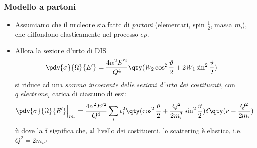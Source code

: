 \subsubsection{Modello a partoni}
\begin{itemize}
    \item Assumiamo che il nucleone sia fatto di \textit{partoni} (elementari, spin $\frac{1}{2}$, massa $m_i$), che diffondono elasticamente nel processo $ep$.
    \item Allora la sezione d'urto di DIS
    \begin{equation*}
    \pdv{\sigma}{\Omega}{E'}=\frac{4\alpha^2E'^2}{Q^4}\qty(W_2\cos^2\frac{\vartheta}{2}+2W_1\sin^2\frac{\vartheta}{2})
    \end{equation*}
    si riduce ad una \textit{somma incoerente delle sezioni d'urto dei costituenti}, con $q\_{electron}e_i$ carica di ciascuno di essi:
    \begin{equation*}
    \pdv{\sigma}{\Omega}{E'}\Big|_{m_i}=\frac{4\alpha^2E'^2}{Q^4}\sum_ie_i^2\qty(\cos^2\frac{\vartheta}{2}+\frac{Q^2}{2m_i^2}\sin^2\frac{\vartheta}{2})\delta\qty(\nu-\frac{Q^2}{2m_i})
    \end{equation*}ù
    dove la $\delta$ significa che, al livello dei costituenti, lo scattering è elastico, i.e. $Q^2=2m_i\nu$
\end{itemize}